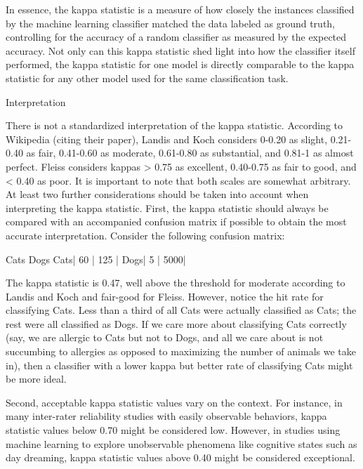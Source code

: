 In essence, the kappa statistic is a measure of how closely the instances classified by the machine learning classifier matched the data labeled as ground truth, controlling for the accuracy of a random classifier as measured by the expected accuracy. Not only can this kappa statistic shed light into how the classifier itself performed, the kappa statistic for one model is directly comparable to the kappa statistic for any other model used for the same classification task.

Interpretation

There is not a standardized interpretation of the kappa statistic. According to Wikipedia (citing their paper), Landis and Koch considers 0-0.20 as slight, 0.21-0.40 as fair, 0.41-0.60 as moderate, 0.61-0.80 as substantial, and 0.81-1 as almost perfect. Fleiss considers kappas > 0.75 as excellent, 0.40-0.75 as fair to good, and < 0.40 as poor. It is important to note that both scales are somewhat arbitrary. At least two further considerations should be taken into account when interpreting the kappa statistic. First, the kappa statistic should always be compared with an accompanied confusion matrix if possible to obtain the most accurate interpretation. Consider the following confusion matrix:

     Cats Dogs
Cats| 60 | 125 |
Dogs| 5  | 5000|

The kappa statistic is 0.47, well above the threshold for moderate according to Landis and Koch and fair-good for Fleiss. However, notice the hit rate for classifying Cats. Less than a third of all Cats were actually classified as Cats; the rest were all classified as Dogs. If we care more about classifying Cats correctly (say, we are allergic to Cats but not to Dogs, and all we care about is not succumbing to allergies as opposed to maximizing the number of animals we take in), then a classifier with a lower kappa but better rate of classifying Cats might be more ideal.

Second, acceptable kappa statistic values vary on the context. For instance, in many inter-rater reliability studies with easily observable behaviors, kappa statistic values below 0.70 might be considered low. However, in studies using machine learning to explore unobservable phenomena like cognitive states such as day dreaming, kappa statistic values above 0.40 might be considered exceptional.

